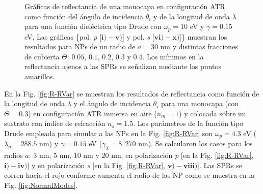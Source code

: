 \documentclass[letterpaper,11pt] {article}
\begin{document}
\begin{figure}[t!]
	\caption{Gráficas de reflectancia de una monocapa en configuración ATR como función del ángulo de incidencia $\theta_i$ y de la longitud de onda $\lambda$ para una función dieléctrica tipo Drude con $\omega_p=10$ eV  y  $\gamma=0. 15$ eV.  Las gráficas \{pol.  \emph{p} [$\mathbf{i)-v)}$] y pol.  \emph{s} [$\mathbf{vi)-x)}$]\} muestran los resultados para NPs de un radio de $a=30$ nm y distintas fracciones de cubierta $\Theta$: $0. 05$, $0. 1$, $0. 2$, $0. 3$ y $0. 4$.  Los mínimos en la reflectancia ajenos a las SPRs se señalizan mediante los puntos amarillos. }	\label{fig:R-ATR10}	
	\end{figure}	

En la Fig.  \ref{fig:R-RVar} se muestran los resultados de reflectancia como función de la longitud de onda $\lambda$ y el ángulo de incidencia $\theta_i$ para una monocapa (con $\Theta=0. 3$) en configuración ATR inmersa en aire ($n_m=1$) y colocada sobre un sustrato con índice de refracción $n_s=1. 5$.  Los parámetros de la función tipo Drude empleada para simular a las NPs  en la Fig.  \ref{fig:R-RVar} son   $\omega_p = 4. 3$ eV ($\lambda_p=288. 5$ nm) y $\gamma = 0. 15$ eV ($\gamma_\lambda=8,270$ nm).  Se calcularon los casos para los radios $a$: $3$ nm, $5$ nm, $10$ nm y $20$ nm,  en polarización \emph{p} [en la Fig.  \ref{fig:R-RVar}, $\mathbf{i)-iv)}$] y en polarización \emph{s} [en la Fig.  \ref{fig:R-RVar}, $\mathbf{v)-viii)}$].  Las SPRs se corren hacia el rojo conforme aumenta el radio de las NP como se muestra en la Fig.  \ref{fig:NormalModes}. 
\end{document}
